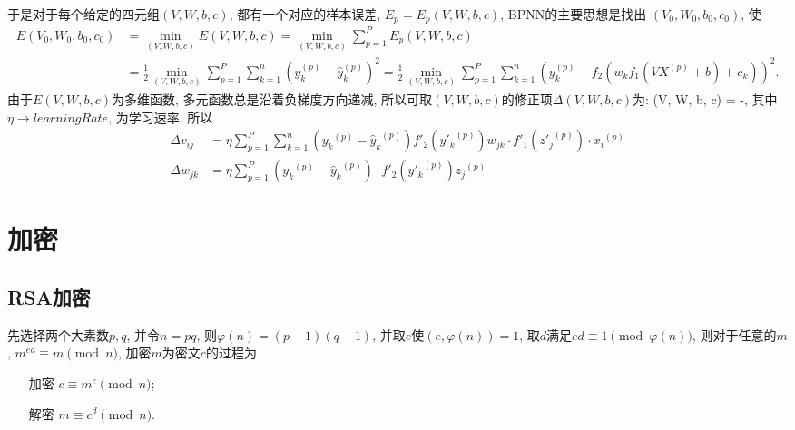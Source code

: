 于是对于每个给定的四元组$(V, W, b, c)$, 都有一个对应的样本误差, $E_{p}=E_{p}(V, W, b, c)$, 
BPNN的主要思想是找出 $(V_0, W_0, b_0, c_0)$, 使
\begin{align*}
E(V_0, W_0, b_0, c_0) 
  & = \min_{(V, W, b, c)}E(V, W, b, c) 
  = \min_{(V, W, b, c)}\sum_{p=1}^{P}E_{p}(V, W, b, c)\\
  & = \frac12\min_{(V, W, b, c)}\sum_{p=1}^{P}\sum_{k=1}^{n}\left(y_{k}^{(p)}-\hat{y}_{k}^{(p)}\right)^2
  = \frac12\min_{(V, W, b, c)}\sum_{p=1}^{P}\sum_{k=1}^{n}\left(y_{k}^{(p)}-f_2(w_k f_1(V X^{(p)} + b) + c_k)\right)^2.
\end{align*}
由于$E(V, W, b, c)$为多维函数, 多元函数总是沿着负梯度方向递减, 所以可取$(V, W, b, c)$的修正项$\Delta (V, W, b, c)$为:
\bee
\Delta (V, W, b, c)
  = -\eta{},
\eee
其中$\eta\to learningRate$, 为学习速率. 所以
\begin{align*}
\Delta v_{ij}
  & = \eta \sum_{p=1}^{P} \sum_{k=1}^{n} ({y_k}^{(p)}-{\hat{y}_k}^{(p)})f'_2({y'_{k}}^{(p)}) w_{jk}\cdot f'_1({z'_{j}}^{(p)}) \cdot {x_{i}}^{(p)}\\
\Delta w_{jk}
  & = \eta\sum_{p=1}^{P}({y_{k}}^{(p)}-{\hat{y}_{k}}^{(p)}) \cdot f'_{2}({y'_k}^{(p)}){z_{j}}^{(p)}
\end{align*}

\newpage

\chapter{加密}
\section{RSA加密}
先选择两个大素数$p,q$, 并令$n=pq$, 则$\varphi(n)=(p-1)(q-1)$, 并取$e$使$(e, \varphi(n))=1$, 取$d$满足$ed\equiv 1\pmod{\varphi(n)}$, 
则对于任意的$m$, $m^{ed}\equiv m\pmod{n}$, 加密$m$为密文$c$的过程为
\begin{itemize}
 \item[加密] $c\equiv m^e \pmod{n}$;
 \item[解密] $m\equiv c^d \pmod{n}$.
\end{itemize}

